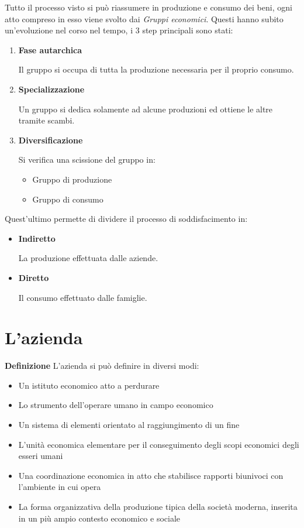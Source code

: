 \documentclass{article}
\newcommand{\df}{\noindent\textbf{Definizione }}
\begin{document}
\noindent Tutto il processo visto si può riassumere in produzione e consumo dei beni, ogni atto compreso in esso viene svolto dai \textit{Gruppi economici}. Questi hanno subito un'evoluzione nel corso nel tempo, i 3 step principali sono stati:
\begin{enumerate}
    \item \textbf{Fase autarchica}

        Il gruppo si occupa di tutta la produzione necessaria per il proprio consumo.

    \item \textbf{Specializzazione}

        Un gruppo si dedica solamente ad alcune produzioni ed ottiene le altre tramite scambi.

    \item \textbf{Diversificazione}

        Si verifica una scissione del gruppo in:
            \begin{itemize}
                \item Gruppo di produzione
                \item Gruppo di consumo\newline
            \end{itemize}    
\end{enumerate}

\noindent Quest'ultimo permette di dividere il processo di soddisfacimento in:
    \begin{itemize}
        \item \textbf{Indiretto}

            La produzione effettuata dalle aziende.
        
        \item \textbf{Diretto}

            Il consumo effettuato dalle famiglie.
        
    \end{itemize}

\section{L'azienda}

\df L'azienda si può definire in diversi modi:
\begin{itemize}
    \item Un istituto economico atto a perdurare
    \item Lo strumento dell’operare umano in campo economico
    \item Un sistema di elementi orientato al raggiungimento di un fine
    \item L’unità economica elementare per il conseguimento degli scopi economici degli esseri umani
    \item Una coordinazione economica in atto che stabilisce rapporti biunivoci con l’ambiente in cui opera
    \item La forma organizzativa della produzione tipica della società moderna, inserita in un più ampio contesto economico e sociale\newline
\end{itemize}
\end{document}

